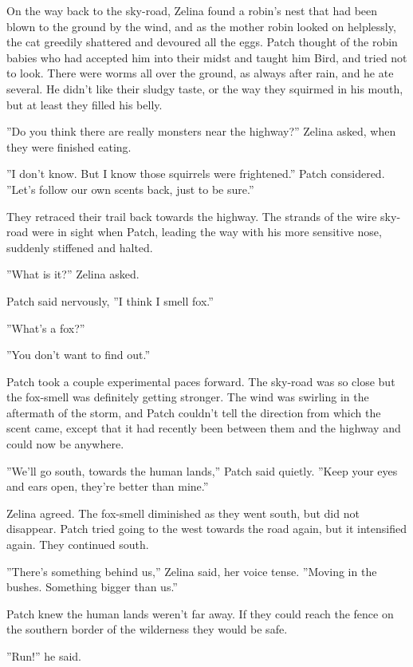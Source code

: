 \documentclass[12pt]{book}
\begin{document}
 On the way back to the sky-road, Zelina found a robin's nest that had been blown to the ground by the wind, and as the mother robin looked on helplessly, the cat greedily shattered and devoured all the eggs. Patch thought of the robin babies who had accepted him into their midst and taught him Bird, and tried not to look. There were worms all over the ground, as always after rain, and he ate several. He didn't like their sludgy taste, or the way they squirmed in his mouth, but at least they filled his belly.\par
 ''Do you think there are really monsters near the highway?'' Zelina asked, when they were finished eating.\par
 ''I don't know. But I know those squirrels were frightened.'' Patch considered. ''Let's follow our own scents back, just to be sure.''\par
 They retraced their trail back towards the highway. The strands of the wire sky-road were in sight when Patch, leading the way with his more sensitive nose, suddenly stiffened and halted.\par
 ''What is it?'' Zelina asked.\par
 Patch said nervously, ''I think I smell fox.''\par
 ''What's a fox?''\par
 ''You don't want to find out.''\par
Patch took a couple experimental paces forward. The sky-road was so close %
 but the fox-smell was definitely getting stronger. The wind was swirling in the aftermath of the storm, and Patch couldn't tell the direction from which the scent came, except that it had recently been between them and the highway %
 and could now be anywhere.\par
''We'll go south, towards the human lands,'' Patch said quietly. ''Keep your eyes and ears open, they're better than mine.''\par
Zelina agreed. The fox-smell diminished as they went south, but did not disappear. Patch tried going to the west towards the road again, but it intensified again. They continued south.\par
''There's something behind us,'' Zelina said, her voice tense. ''Moving in the bushes. Something bigger than us.''\par
Patch knew the human lands weren't far away. If they could reach the fence on the southern border of the wilderness they would be safe.\par
''Run!'' he said.\par
\end{document}

